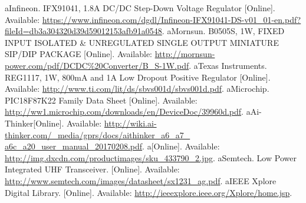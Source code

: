 \begin{thebibliography}{1}
	\bibitem aInfineon. IFX91041, 1.8A DC/DC Step-Down Voltage Regulator [Online]. Available: \href{https://www.infineon.com/dgdl/Infineon-IFX91041-DS-v01_01-en.pdf?fileId=db3a304320d39d59012153afb91a0548}{https://www.infineon.com/dgdl/Infineon-IFX91041-DS-v01\_01-en.pdf?fileId=db3a304320d39d59012153afb91a0548}.
	\label{stepdown}
	\bibitem aMornsun. B0505S, 1W, FIXED INPUT ISOLATED \& UNREGULATED
	SINGLE OUTPUT MINIATURE SIP/DIP PACKAGE [Online]. Available: \href{http://mornsun-power.com/pdf/DCDC\%20Converter/B_S-1W.pdf}{http://mornsun-power.com/pdf/DCDC\%20Converter/B\_S-1W.pdf}.
	\label{isolado}
	\bibitem aTexas Instruments. REG1117, 1W, 800mA and 1A Low Dropout Positive Regulator [Online]. Available: \href{http://www.ti.com/lit/ds/sbvs001d/sbvs001d.pdf}{http://www.ti.com/lit/ds/sbvs001d/sbvs001d.pdf}.
	\label{33pdf}
	\bibitem aMicrochip. PIC18F87K22 Family Data Sheet [Online]. Available: \href{http://ww1.microchip.com/downloads/en/DeviceDoc/39960d.pdf}{http://ww1.microchip.com/downloads/en/DeviceDoc/39960d.pdf}.
	\label{picpdf}
	\bibitem aAi-Thinker[Online]. Available: \href{http://wiki.ai-thinker.com/_media/gprs/docs/aithinker_a6_a7_a6c_a20_user_manual_20170208.pdf}{http://wiki.ai-thinker.com/\_media/gprs/docs/aithinker\_a6\_a7\_\\a6c\_a20\_user\_manual\_20170208.pdf}.
	\label{gsmpdf}
	\bibitem a[Online]. Available: \href{http://img.dxcdn.com/productimages/sku_433790_2.jpg}{http://img.dxcdn.com/productimages/sku\_433790\_2.jpg}.
	\label{gsmimagem}
	\bibitem aSemtech. Low Power Integrated UHF Transceiver. [Online]. Available: \href{http://www.semtech.com/images/datasheet/sx1231_ag.pdf}{http://www.semtech.com/images/datasheet/sx1231\_ag.pdf}.
	\label{sx1231pdf}
	\bibitem aIEEE Xplore Digital Library. [Online]. Available: \href{http://ieeexplore.ieee.org/Xplore/home.jsp}{http://ieeexplore.ieee.org/Xplore/home.jsp}.
	\label{ieee}


\end{thebibliography}

